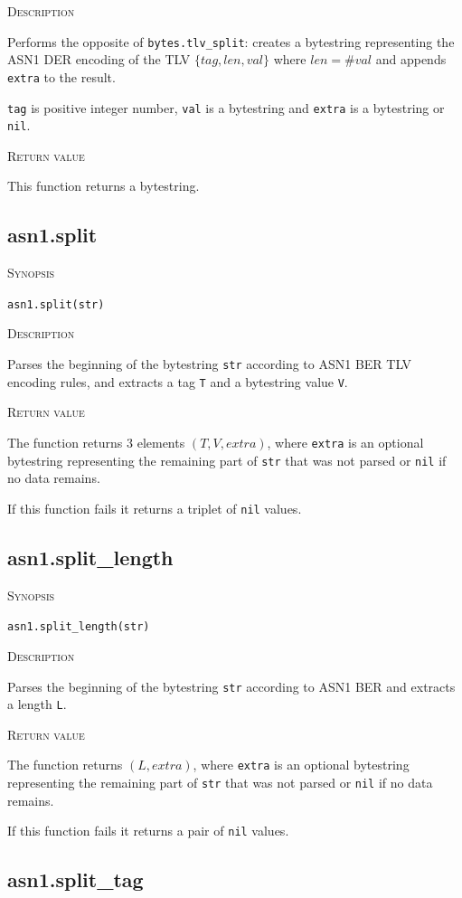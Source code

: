 \documentclass[11pt]{report}
\newcommand{\mansection}[1]{\vspace{0.5em}\par\noindent\textsc{#1}\vspace{0.5em}\par}
\newcommand{\syn}[1]{\texttt{#1}}
\begin{document}
\mansection{Description}
  Performs the opposite of \syn{bytes.tlv\_split}: creates a bytestring 
  representing the ASN1 DER encoding of the TLV $\{tag,len,val\}$ where $len=\#val$ 
  and appends \syn{extra} to the result.

  \syn{tag} is positive integer number, \syn{val} is a bytestring and 
  \syn{extra} is a bytestring or \syn{nil}.

\mansection{Return value}
  This function returns a bytestring.

\subsection{asn1.split}

\mansection{Synopsis}
\syn{asn1.split(str)}

\mansection{Description}
  Parses the beginning of the bytestring \syn{str} according to ASN1 BER 
  TLV encoding rules, and extracts a tag \syn{T} and a bytestring value \syn{V}.

\mansection{Return value}
  The function returns 3 elements $(T, V, extra)$, 
  where \syn{extra} is an optional bytestring representing the remaining part of 
  \syn{str} that was not parsed or \syn{nil} if no data remains.

  If this function fails it returns a triplet of \syn{nil} values.


\subsection{asn1.split\_length}

\mansection{Synopsis}
\syn{asn1.split\_length(str)}

\mansection{Description}
  Parses the beginning of the bytestring \syn{str} according to ASN1 BER 
  and extracts a length \syn{L}. 

\mansection{Return value}
  The function returns $(L, extra)$, where \syn{extra} is an optional bytestring 
  representing the remaining part of \syn{str} that was not parsed or \syn{nil} 
  if no data remains.

  If this function fails it returns a pair of \syn{nil} values.


\subsection{asn1.split\_tag}
\end{document}
